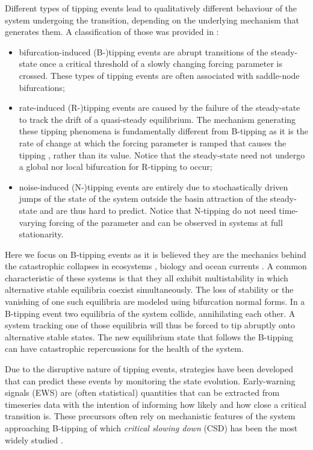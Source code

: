 \documentclass[10pt]{article}
\begin{document}
Different types of tipping events lead to qualitatively different behaviour of the system undergoing the transition, depending on the underlying mechanism that generates them. 
A classification of those was provided in \cite{Ashwin2012}:
%
\begin{itemize}
        \item bifurcation-induced (B-)tipping events are abrupt transitions of the steady-state once a critical threshold of a slowly changing forcing parameter is crossed. These types of tipping events are often associated with saddle-node bifurcations;
     \item rate-induced (R-)tipping events are caused by the failure of the steady-state to track the drift of a quasi-steady equilibrium. The mechanism generating these tipping phenomena is fundamentally different from B-tipping as it is the rate of change at which the forcing parameter is ramped that causes the tipping \cite{Ashwin2017}, rather than its value. Notice that the steady-state need not undergo a global nor local bifurcation for R-tipping to occur;
     \item noise-induced (N-)tipping events are entirely due to stochastically driven jumps of the state of the system outside the basin attraction of the steady-state and are thus hard to predict. Notice that N-tipping do not need time-varying forcing of the parameter and can be observed in systems at full stationarity.
\end{itemize}

Here we focus on B-tipping events as it is believed they are the mechanics behind the catastrophic collapses in ecosystems \cite{May1977}, biology \cite{Donovan2015} and ocean currents \cite{Lohmann2024,vanWesten025a}.
A common characteristic of these systems is that they all exhibit multistability in which alternative stable equilibria coexist simultaneously.
The loss of stability or the vanishing of one such equilibria are modeled using bifurcation normal forms.
In a B-tipping event two equilibria of the system collide, annihilating each other.
A system tracking one of those equilibria will thus be forced to tip abruptly onto alternative stable states.
The new equilibrium state that follows the B-tipping can have catastrophic repercussions for the health of the system.

Due to the disruptive nature of tipping events, strategies have been developed that can predict these events by monitoring the state evolution.
Early-warning signals (EWS) are (often statistical) quantities that can be extracted from timeseries data with the intention of informing how likely and how close a critical transition is.
These precursors often rely on mechanistic features of the system approaching B-tipping of which \textit{critical slowing down} (CSD) has been the most widely studied \cite{VanNes2007, Dakos2008}.
\end{document}
